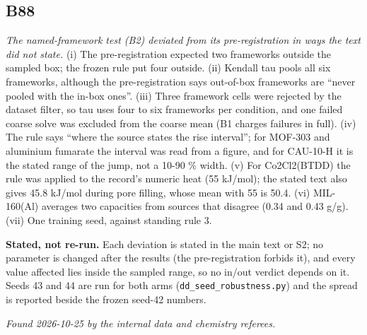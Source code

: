 \documentclass[10pt]{article}
\begin{document}
\subsection*{B88}\label{led:B88}
\begin{description}[leftmargin=0pt,itemsep=1pt]
\item[Defect.] \emph{The named-framework test (B2) deviated from its pre-registration in ways the text did not state.} (i) The pre-registration expected two frameworks outside the sampled box; the frozen rule put four outside. (ii) Kendall tau pools all six frameworks, although the pre-registration says out-of-box frameworks are ``never pooled with the in-box ones''. (iii) Three framework cells were rejected by the dataset filter, so tau uses four to six frameworks per condition, and one failed coarse solve was excluded from the coarse mean (B1 charges failures in full). (iv) The rule says ``where the source states the rise interval''; for MOF-303 and aluminium fumarate the interval was read from a figure, and for CAU-10-H it is the stated range of the jump, not a 10-90 \% width. (v) For Co2Cl2(BTDD) the rule was applied to the record's numeric heat (55 kJ/mol); the stated text also gives 45.8 kJ/mol during pore filling, whose mean with 55 is 50.4. (vi) MIL-160(Al) averages two capacities from sources that disagree (0.34 and 0.43 g/g). (vii) One training seed, against standing rule 3.
\item[Resolution.] \textbf{Stated, not re-run.} Each deviation is stated in the main text or S2; no parameter is changed after the results (the pre-registration forbids it), and every value affected lies inside the sampled range, so no in/out verdict depends on it. Seeds 43 and 44 are run for both arms (\texttt{dd\_seed\_robustness.py}) and the spread is reported beside the frozen seed-42 numbers.
\item[Note.] \emph{Found 2026-10-25 by the internal data and chemistry referees.}
\end{description}
\end{document}
